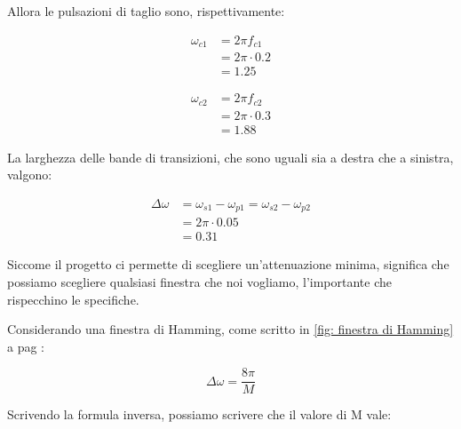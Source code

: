 Allora le pulsazioni di taglio sono, rispettivamente: 

{
    \Large 
    \begin{equation}
        \begin{split}
            \omega_{c1} &= 2 \pi f_{c1} 
            \\
            &= 2 \pi \cdot 0.2 
            \\
            &= 1.25 
        \end{split} 
    \end{equation}
}

{
    \Large 
    \begin{equation}
        \begin{split}
            \omega_{c2} &= 2 \pi f_{c2} 
            \\
            &= 2 \pi \cdot 0.3 
            \\
            &= 1.88
        \end{split} 
    \end{equation}
}

La larghezza delle bande di transizioni, che sono uguali sia a destra che a sinistra, valgono: 

{
    \Large 
    \begin{equation}
        \begin{split}
        \Delta \omega 
        &= 
        \omega_{s1} - \omega_{p1} 
        = 
        \omega_{s2} - \omega_{p2} 
        \\
        &= 
        2 \pi \cdot 0.05 
        \\
        &= 
        0.31 
        \end{split}
    \end{equation}
}

\newpage 

Siccome il progetto ci permette di scegliere un'attenuazione minima, significa che possiamo scegliere qualsiasi finestra che noi vogliamo, 
l'importante che rispecchino le specifiche. \newline 

Considerando una finestra di Hamming, come scritto in \ref{fig: finestra di Hamming}  a pag \pageref{fig: finestra di Hamming}: 

{
    \Large 
    \begin{equation}
        \Delta \omega = \dfrac{8 \pi}{M}
    \end{equation}
}

Scrivendo la formula inversa, possiamo scrivere che il valore di M vale: 


